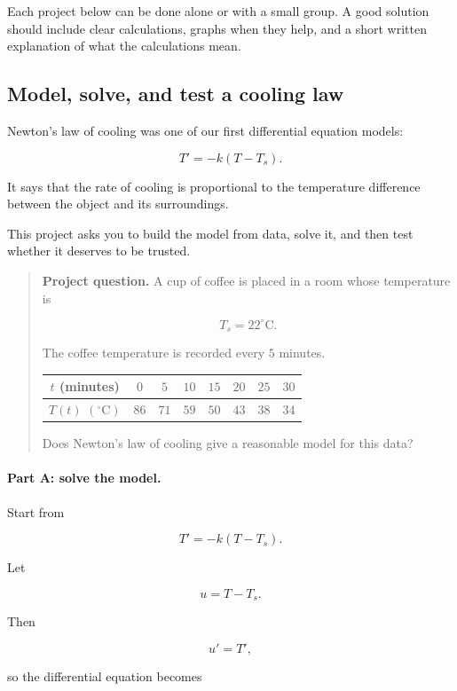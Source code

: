 Each project below can be done alone or with a small group.  A good solution should
include clear calculations, graphs when they help, and a short written explanation of what
the calculations mean.

\subsection{Model, solve, and test a cooling law}
\label{subsec:project-cooling-law}

Newton's law of cooling was one of our first differential equation models:

\[
T'=-k(T-T_s).
\]

It says that the rate of cooling is proportional to the temperature difference between the
object and its surroundings.

This project asks you to build the model from data, solve it, and then test whether it
deserves to be trusted.

\begin{quote}
\textbf{Project question.}
A cup of coffee is placed in a room whose temperature is

\[
T_s=22^\circ\text{C}.
\]

The coffee temperature is recorded every \(5\) minutes.

\begin{center}
\renewcommand{\arraystretch}{1.25}
\begin{tabular}{c|ccccccc}
\(t\) (minutes) & \(0\) & \(5\) & \(10\) & \(15\) & \(20\) & \(25\) & \(30\) \\ \hline
\(T(t)\) \((^\circ\text{C})\) & \(86\) & \(71\) & \(59\) & \(50\) & \(43\) & \(38\) & \(34\)
\end{tabular}
\end{center}

Does Newton's law of cooling give a reasonable model for this data?
\end{quote}

\paragraph{Part A: solve the model.}
Start from

\[
T'=-k(T-T_s).
\]

Let

\[
u=T-T_s.
\]

Then

\[
u'=T',
\]

so the differential equation becomes

